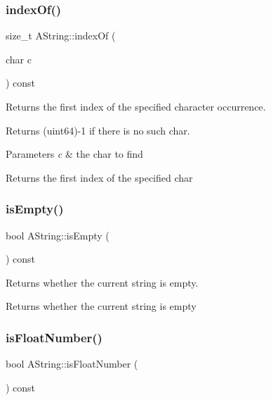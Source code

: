 \subsubsection{\texorpdfstring{indexOf()}{indexOf()}}
{\footnotesize\ttfamily size\+\_\+t A\+String\+::index\+Of (\begin{DoxyParamCaption}\item[{char}]{c }\end{DoxyParamCaption}) const}



Returns the first index of the specified character occurrence. 

Returns (uint64)-\/1 if there is no such char.


\begin{DoxyParams}{Parameters}
{\em c} & the char to find \\
\hline
\end{DoxyParams}
\begin{DoxyReturn}{Returns}
the first index of the specified char 
\end{DoxyReturn}
\mbox{\label{class_a_string_ab8146522d4484d8aec3005dbe60dcfef}} 
\subsubsection{\texorpdfstring{isEmpty()}{isEmpty()}}
{\footnotesize\ttfamily bool A\+String\+::is\+Empty (\begin{DoxyParamCaption}{ }\end{DoxyParamCaption}) const}



Returns whether the current string is empty. 

\begin{DoxyReturn}{Returns}
whether the current string is empty 
\end{DoxyReturn}
\mbox{\label{class_a_string_a693a5dd685ee812406e6643fd964ec7c}} 
\subsubsection{\texorpdfstring{isFloatNumber()}{isFloatNumber()}}
{\footnotesize\ttfamily bool A\+String\+::is\+Float\+Number (\begin{DoxyParamCaption}{ }\end{DoxyParamCaption}) const}



